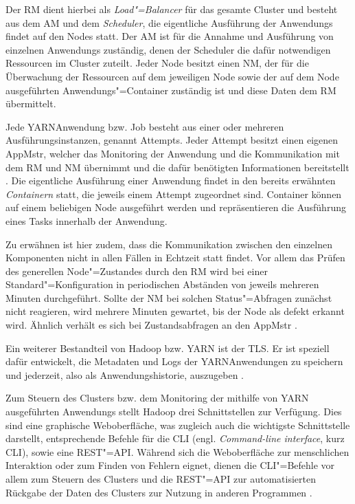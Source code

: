 Der \gls{RM} dient hierbei als \emph{Load"=Balancer} für das gesamte Cluster und besteht aus dem \gls{AM} und dem \emph{Scheduler}, die eigentliche Ausführung der \glspl{Anwendung} findet auf den Nodes statt.
Der \gls{AM} ist für die Annahme und Ausführung von einzelnen \glspl{Anwendung} zuständig, denen der Scheduler die dafür notwendigen Ressourcen im Cluster zuteilt.
Jeder Node besitzt einen \gls{NM}, der für die Überwachung der Ressourcen auf dem jeweiligen Node sowie der auf dem Node ausgeführten Anwendungs"=Container zuständig ist und diese Daten dem \gls{RM} übermittelt.

Jede \gls{YARN}\gls{Anwendung} bzw. Job besteht aus einer oder mehreren Ausführungsinstanzen, genannt Attempts.
Jeder \gls{Attempt} besitzt einen eigenen \gls{AppMstr}, welcher das Monitoring der \gls{Anwendung} und die Kommunikation mit dem \gls{RM} und \gls{NM} übernimmt und die dafür benötigten Informationen bereitstellt \cite{HadoopYarnArch271}.
Die eigentliche Ausführung einer \gls{Anwendung} findet in den bereits erwähnten \emph{Containern} statt, die jeweils einem \gls{Attempt} zugeordnet sind.
Container können auf einem beliebigen Node ausgeführt werden und repräsentieren die Ausführung eines Tasks innerhalb der Anwendung.

Zu erwähnen ist hier zudem, dass die Kommunikation zwischen den einzelnen Komponenten nicht in allen Fällen in Echtzeit statt findet.
Vor allem das Prüfen des generellen Node"=Zustandes durch den \gls{RM} wird bei einer Standard"=Konfiguration in periodischen Abständen von jeweils mehreren Minuten durchgeführt.
Sollte der \gls{NM} bei solchen Status"=Abfragen zunächst nicht reagieren, wird mehrere Minuten gewartet, bis der Node als defekt erkannt wird.
Ähnlich verhält es sich bei Zustandsabfragen an den \gls{AppMstr} \cite{HadoopYarnConfig271}.

Ein weiterer Bestandteil von Hadoop bzw. \gls{YARN} ist der \gls{TLS}.
Er ist speziell dafür entwickelt, die Metadaten und Logs der \gls{YARN}\gls{Anwendung}en zu speichern und jederzeit, also als Anwendungshistorie, auszugeben \cite{HadoopYarnTlServer271}.

Zum Steuern des Clusters bzw. dem Monitoring der mithilfe von \gls{YARN} ausgeführten \glspl{Anwendung} stellt Hadoop drei Schnittstellen zur Verfügung.
Dies sind eine graphische Weboberfläche, was zugleich auch die wichtigste Schnittstelle darstellt, entsprechende Befehle für die \acrlong{CLI} (engl. \emph{Command-line interface}, kurz \acrshort{CLI}), sowie eine \gls{REST}"=API.
Während sich die Weboberfläche zur menschlichen Interaktion oder zum Finden von Fehlern eignet, dienen die \gls{CLI}"=Befehle vor allem zum Steuern des Clusters und die \gls{REST}"=API zur automatisierten Rückgabe der Daten des Clusters zur Nutzung in anderen Programmen \cite{HadoopClusterSetup271,HadoopYarnCmds271,HadoopRmApi271,HadoopNmApi271}.


